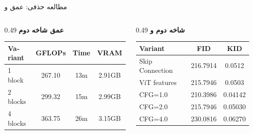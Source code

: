 \documentclass[aspectratio=169, 10pt]{beamer}
\newcommand{\cfg}{\lr{CFG}}
\begin{document}
\begin{frame}{مطالعه حذفی: عمق و \cfg{}}
    \begin{columns}[onlytextwidth]
        \begin{column}{0.49\textwidth}
            \centering
            {\bfseries عمق شاخه دوم}\\[0.3em]
            \begin{latin}
            \begin{tabular}{lccc}
                \toprule
                Variant & GFLOPs & Time & VRAM\\
                \midrule
                1 block & 267.10 & 13m & 2.91GB\\
                2 blocks & 299.32 & 15m & 2.99GB\\
                4 blocks & 363.75 & 26m & 3.15GB\\
                \bottomrule
            \end{tabular}
            \end{latin}
        \end{column}
        \begin{column}{0.49\textwidth}
            \centering
            {\bfseries شاخه دوم و \cfg{}}\\[0.3em]
            \begin{latin}
            \begin{tabular}{lcc}
                \toprule
                Variant & FID & KID\\
                \midrule
                Skip Connection & 216.7914 & 0.0512\\
                ViT features & 215.7946 & 0.0503\\
                \midrule
                CFG=1.0 & 210.3986 & 0.04142\\
                CFG=2.0 & 215.7946 & 0.05030\\
                CFG=4.0 & 230.0816 & 0.06270\\
                \bottomrule
            \end{tabular}
            \end{latin}
        \end{column}
    \end{columns}
\end{frame}
\end{document}
